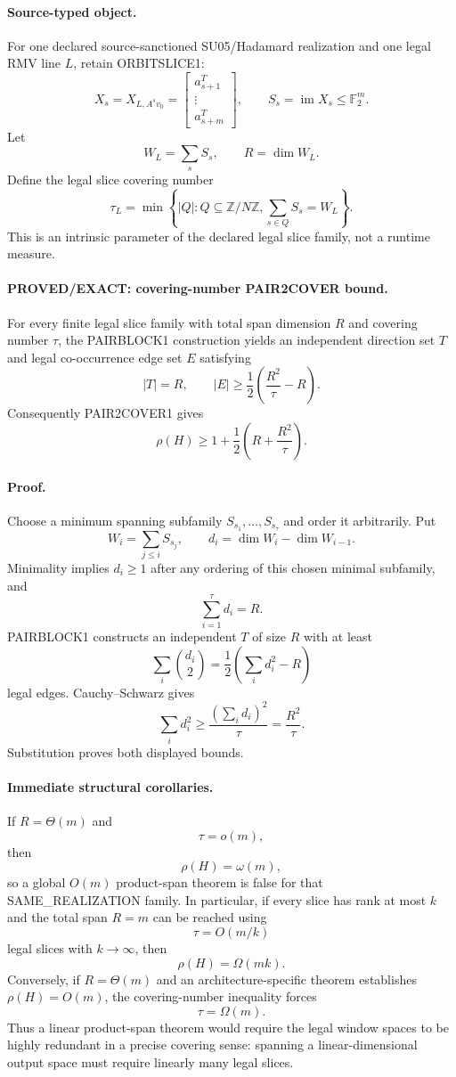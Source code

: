 \documentclass[11pt]{article}
\begin{document}
\paragraph{Source-typed object.}
For one declared source-sanctioned SU05/Hadamard realization and one legal RMV line $L$, retain ORBITSLICE1:
\[
X_s=X_{L,A^sv_0}=
\begin{bmatrix}
a_{s+1}^T\\ \vdots\\ a_{s+m}^T
\end{bmatrix},
\qquad
S_s=\operatorname{im}X_s\le\mathbb F_2^m.
\]
Let
\[
W_L=\sum_s S_s,\qquad R=\dim W_L.
\]
Define the legal slice covering number
\[
\boxed{
\tau_L=\min\left\{|Q|:Q\subseteq\mathbb Z/N\mathbb Z,\sum_{s\in Q}S_s=W_L\right\}.
}
\]
This is an intrinsic parameter of the declared legal slice family, not a runtime measure.

\paragraph{PROVED/EXACT: covering-number PAIR2COVER bound.}
For every finite legal slice family with total span dimension $R$ and covering number $\tau$, the PAIRBLOCK1 construction yields an independent direction set $T$ and legal co-occurrence edge set $E$ satisfying
\[
\boxed{
|T|=R,\qquad
|E|\ge \frac12\left(\frac{R^2}{\tau}-R\right).
}
\]
Consequently PAIR2COVER1 gives
\[
\boxed{
\rho(H)\ge
1+\frac12\left(R+\frac{R^2}{\tau}\right).
}
\]

\paragraph{Proof.}
Choose a minimum spanning subfamily $S_{s_1},\ldots,S_{s_\tau}$ and order it arbitrarily. Put
\[
W_i=\sum_{j\le i}S_{s_j},\qquad
d_i=\dim W_i-\dim W_{i-1}.
\]
Minimality implies $d_i\ge1$ after any ordering of this chosen minimal subfamily, and
\[
\sum_{i=1}^{\tau}d_i=R.
\]
PAIRBLOCK1 constructs an independent $T$ of size $R$ with at least
\[
\sum_i\binom{d_i}{2}
=\frac12\left(\sum_i d_i^2-R\right)
\]
legal edges. Cauchy--Schwarz gives
\[
\sum_i d_i^2\ge\frac{(\sum_i d_i)^2}{\tau}=\frac{R^2}{\tau}.
\]
Substitution proves both displayed bounds.

\paragraph{Immediate structural corollaries.}
If $R=\Theta(m)$ and
\[
\tau=o(m),
\]
then
\[
\rho(H)=\omega(m),
\]
so a global $O(m)$ product-span theorem is false for that SAME\_REALIZATION family. In particular, if every slice has rank at most $k$ and the total span $R=m$ can be reached using
\[
\tau=O(m/k)
\]
legal slices with $k\to\infty$, then
\[
\rho(H)=\Omega(mk).
\]
Conversely, if $R=\Theta(m)$ and an architecture-specific theorem establishes $\rho(H)=O(m)$, the covering-number inequality forces
\[
\boxed{\tau=\Omega(m).}
\]
Thus a linear product-span theorem would require the legal window spaces to be highly redundant in a precise covering sense: spanning a linear-dimensional output space must require linearly many legal slices.
\end{document}
